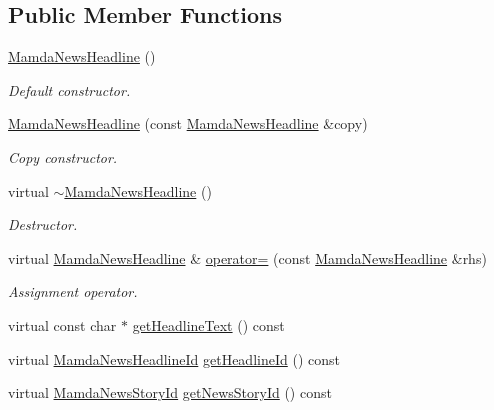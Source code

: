 \subsection*{Public Member Functions}
\begin{CompactItemize}
\item 
\hyperlink{classWombat_1_1MamdaNewsHeadline_17c1e9b410ec2c1a453ecb5e1a911d10}{Mamda\-News\-Headline} ()
\begin{CompactList}\small\item\em Default constructor. \item\end{CompactList}\item 
\hyperlink{classWombat_1_1MamdaNewsHeadline_64a25a7f1f0400d6b75732d906348842}{Mamda\-News\-Headline} (const \hyperlink{classWombat_1_1MamdaNewsHeadline}{Mamda\-News\-Headline} \&copy)
\begin{CompactList}\small\item\em Copy constructor. \item\end{CompactList}\item 
virtual \hyperlink{classWombat_1_1MamdaNewsHeadline_ae7508978fbfeefb5bc976646aafc802}{$\sim$Mamda\-News\-Headline} ()
\begin{CompactList}\small\item\em Destructor. \item\end{CompactList}\item 
virtual \hyperlink{classWombat_1_1MamdaNewsHeadline}{Mamda\-News\-Headline} \& \hyperlink{classWombat_1_1MamdaNewsHeadline_393f9ba427b7e37e471a147152293da1}{operator=} (const \hyperlink{classWombat_1_1MamdaNewsHeadline}{Mamda\-News\-Headline} \&rhs)
\begin{CompactList}\small\item\em Assignment operator. \item\end{CompactList}\item 
virtual const char $\ast$ \hyperlink{classWombat_1_1MamdaNewsHeadline_7c4c336c485773a27dd12ccbc93bcfce}{get\-Headline\-Text} () const 
\item 
virtual \hyperlink{namespaceWombat_cb354a5fc91d5b728f8f1255aae3e196}{Mamda\-News\-Headline\-Id} \hyperlink{classWombat_1_1MamdaNewsHeadline_5958cb72f09cce3b761999ee28e27810}{get\-Headline\-Id} () const 
\item 
virtual \hyperlink{namespaceWombat_f7b94f4bb44eb78420c0d3ba0413424e}{Mamda\-News\-Story\-Id} \hyperlink{classWombat_1_1MamdaNewsHeadline_b30a668741dbbb00450c6a573fdf084f}{get\-News\-Story\-Id} () const 

\end{CompactItemize}
